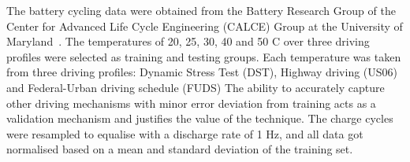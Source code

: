 %
%
The battery cycling data were obtained from the Battery Research Group of the
Center for Advanced Life Cycle Engineering (CALCE) Group
at the University of Maryland~\cite{noauthor_calce_2017}.
The temperatures of 20, 25, 30, 40 and 50 \textdegree{}C over three driving profiles were selected as training and testing groups.
Each temperature was taken from three driving profiles: Dynamic Stress Test (DST), Highway driving (US06) and Federal-Urban driving schedule (FUDS)
The ability to accurately capture other driving mechanisms with minor error deviation from training acts as a validation mechanism and justifies the value of the technique.
The charge cycles were resampled to equalise with a discharge rate of 1 Hz, and all data got normalised based on a mean and standard deviation of the training set.

